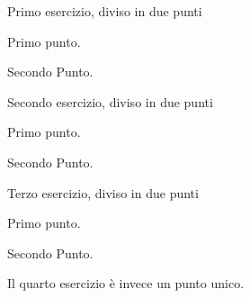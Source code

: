 \documentclass[italian, a4paper]{article}
\begin{document}
\riga

\begin{Ex}
Primo esercizio, diviso in due punti
\begin{lett}
\item Primo punto.
\item Secondo Punto.
\end{lett}
\end{Ex}

\begin{Ex}
Secondo esercizio, diviso in due punti
\begin{lett}
\item Primo punto.
\item Secondo Punto.
\end{lett}
\end{Ex}

\begin{Ex}
Terzo esercizio, diviso in due punti
\begin{lett}
\item Primo punto.
\item Secondo Punto.
\end{lett}
\end{Ex}

\begin{Ex}
Il quarto esercizio è invece un punto unico.
\end{Ex}
\end{document}
